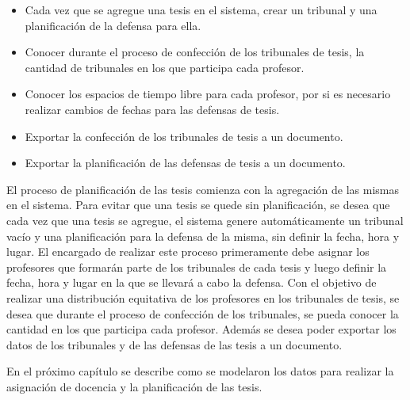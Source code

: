\begin{itemize}
    \item Cada vez que se agregue una tesis en el sistema, crear un tribunal y una planificación de la defensa para ella.
    \item Conocer durante el proceso de confección de los tribunales de tesis, la cantidad de tribunales 
    en los que participa cada profesor.
    \item Conocer los espacios de tiempo libre para cada profesor, por si es necesario realizar cambios de fechas para las defensas de tesis. 
    \item Exportar la confección de los tribunales de tesis a un documento.
    \item Exportar la planificación de las defensas de tesis a un documento.
\end{itemize}

El proceso de planificación de las tesis comienza con la agregación de las mismas en el sistema. 
Para evitar que una tesis se quede sin planificación, se desea que cada vez que una tesis se agregue, el sistema genere automáticamente 
un tribunal vacío y una planificación para la defensa de la misma, sin definir la fecha, hora y lugar.
El encargado de realizar este proceso primeramente debe asignar los profesores que formarán parte de los tribunales de 
cada tesis y luego definir la fecha, hora y lugar en la que se llevará a cabo la defensa. 
Con el objetivo de realizar una distribución equitativa de los profesores en los tribunales de tesis, 
se desea que durante el proceso de confección de los tribunales, se pueda conocer la cantidad en los que participa cada profesor.
Además se desea poder exportar los datos de los tribunales y de las defensas de las tesis a un documento. 


En el próximo capítulo se describe como se modelaron los datos para realizar la asignación de 
docencia y la planificación de las tesis.


